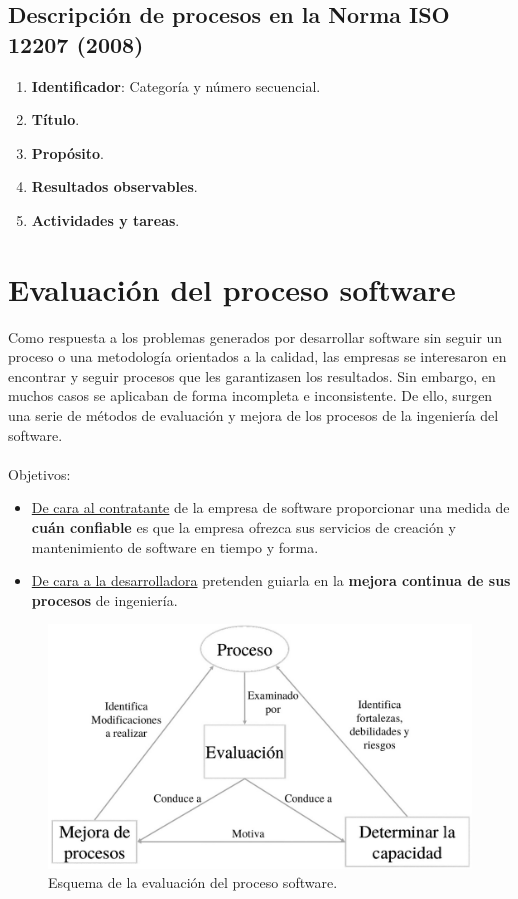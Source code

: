 \subsection{Descripción de procesos en la Norma ISO 12207 (2008)}

\begin{enumerate}
    \item \textbf{Identificador}: Categoría y número secuencial.
    \item \textbf{Título}.
    \item \textbf{Propósito}.
    \item \textbf{Resultados observables}.
    \item \textbf{Actividades y tareas}.
\end{enumerate}


\section{Evaluación del proceso software}
Como respuesta a los problemas generados por desarrollar software sin seguir un proceso o una metodología orientados a la calidad, las empresas se interesaron en encontrar y seguir procesos que les garantizasen los resultados. Sin embargo, en muchos casos se aplicaban de forma incompleta e inconsistente. De ello, surgen una serie de métodos de evaluación y mejora de los procesos de la ingeniería del software.
\\\\
Objetivos:
\begin{itemize}
    \item \uline{De cara al contratante} de la empresa de software proporcionar una medida de \textbf{cuán confiable} es que la empresa ofrezca sus servicios de creación y mantenimiento de software en tiempo y forma.
    \item \uline{De cara a la desarrolladora} pretenden guiarla en la \textbf{mejora continua de sus procesos} de ingeniería.
\end{itemize}

\begin{figure}[H]
    \centering
    \includegraphics[width=0.7\linewidth]{Resources/evaluacionSoftware}
    \caption{Esquema de la evaluación del proceso software.}
    \label{fig:evaluacionSoftware}
\end{figure}


